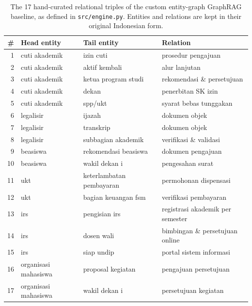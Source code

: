 \begin{table}[!htbp]
\centering
\caption{The 17 hand-curated relational triples of the custom entity-graph GraphRAG baseline, as defined in \texttt{src/engine.py}. Entities and relations are kept in their original Indonesian form.}
\label{tab:triples}
\scriptsize
\setlength{\tabcolsep}{4pt}
\begin{tabular}{rlll}
\toprule
\# & Head entity & Tail entity & Relation \\
\midrule
1 & cuti akademik & izin cuti & prosedur pengajuan \\
2 & cuti akademik & aktif kembali & alur lanjutan \\
3 & cuti akademik & ketua program studi & rekomendasi \& persetujuan \\
4 & cuti akademik & dekan & penerbitan SK izin \\
5 & cuti akademik & spp/ukt & syarat bebas tunggakan \\
6 & legalisir & ijazah & dokumen objek \\
7 & legalisir & transkrip & dokumen objek \\
8 & legalisir & subbagian akademik & verifikasi \& validasi \\
9 & beasiswa & rekomendasi beasiswa & dokumen pengajuan \\
10 & beasiswa & wakil dekan i & pengesahan surat \\
11 & ukt & keterlambatan pembayaran & permohonan dispensasi \\
12 & ukt & bagian keuangan fsm & verifikasi pembayaran \\
13 & irs & pengisian irs & registrasi akademik per semester \\
14 & irs & dosen wali & bimbingan \& persetujuan online \\
15 & irs & siap undip & portal sistem informasi \\
16 & organisasi mahasiswa & proposal kegiatan & pengajuan persetujuan \\
17 & organisasi mahasiswa & wakil dekan i & persetujuan kegiatan \\
\bottomrule
\end{tabular}
\end{table}

